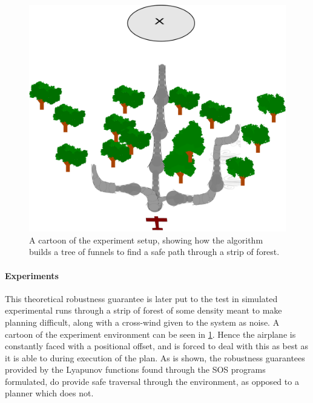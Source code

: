 \begin{figure}
  \centering
  \includegraphics[scale=.1]{figures/experiments/experiment-airplane-strip}
  \caption[The experiment setup visualized]{A cartoon of the experiment setup, showing how the \rrtfunnel{}
    algorithm builds a tree of funnels to find a safe path through a strip of
    forest.}
  \label{fig:experiments-cartoon}
\end{figure}

\paragraph{Experiments}
This theoretical robustness guarantee is later put to the test in simulated
experimental runs through a strip of forest of some density meant to make
planning difficult, along with a cross-wind given to the system as noise. A
cartoon of the experiment environment can be seen in
\cref{fig:experiments-cartoon}. Hence the airplane is constantly faced with a
positional offset, and is forced to deal with this as best as it is able to
during execution of the plan. As is shown, the robustness guarantees provided by
the Lyapunov functions found through the \ac{SOS} programs formulated, do
provide safe traversal through the environment, as opposed to a planner which
does not.


